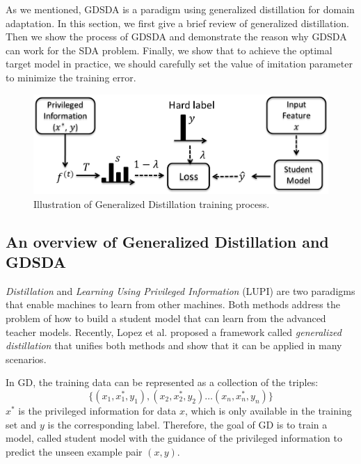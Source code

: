 As we mentioned, GDSDA is a paradigm using generalized distillation for domain adaptation. In this section, we first give a brief review of generalized distillation. Then we show the process of GDSDA and demonstrate the reason why GDSDA can work for the SDA problem. Finally, we show that to achieve the optimal target model in practice, we should carefully set the value of imitation parameter to minimize the training error. 
\begin{figure}\label{fig:gd}
\centering
\includegraphics[scale=.4]{figure/GD.png}
\caption{Illustration of Generalized Distillation training process.}
\end{figure}
\subsection{An overview of Generalized Distillation and GDSDA}
\textit{Distillation} \cite{hinton2015distilling} and \textit{Learning Using Privileged Information} (LUPI) \cite{vapnik2015learning} are two paradigms that enable machines to learn from other machines. Both methods address the problem of how to build a student model that can learn from the advanced teacher models. Recently, Lopez {et al.} \cite{lopez2015unifying} proposed a framework called \textit{generalized distillation} that unifies both methods and show that it can be applied in many scenarios.

In GD, the training data can be represented as a collection of the triples:
\[\{\left(x_1,x_1^*,y_1\right),\left(x_2,x_2^*,y_2\right) \dots \left(x_n,x_n^*,y_n\right)\}\]
$x^*$ is the privileged information for data $x$, which is only available in the training set and $y$ is the corresponding label. Therefore, the goal of GD is to train a model, called student model with the guidance of the privileged information to predict the unseen example pair $(x,y)$.


